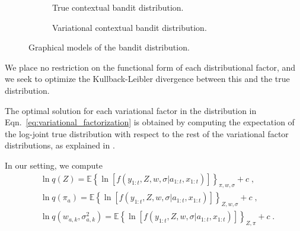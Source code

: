 \documentclass{article}
\newcommand{\eValue}[1]{\mathbb{E}\left\{ #1 \right\}}
\begin{document}
\begin{figure*}[!h]
	\centering
	\begin{subfigure}[b]{0.49\textwidth}
		\begin{center}
			
		\end{center}
		\label{fig:true_bandit}
		\caption{True contextual bandit distribution.}
	\end{subfigure}
	\begin{subfigure}[b]{0.49\textwidth}	
		\begin{center}
			
		\end{center}
		\label{fig:variational_bandit}
		\caption{Variational contextual bandit distribution.}
	\end{subfigure}
	\caption{Graphical models of the bandit distribution.}
	\label{fig:graphical_bandit}
\end{figure*}

We place no restriction on the functional form of each distributional factor, and we seek to optimize the Kullback-Leibler divergence between this and the true distribution.

The optimal solution for each variational factor in the distribution in Eqn.~\eqref{eq:variational_factorization} is obtained by computing the expectation of the log-joint true distribution with respect to the rest of the variational factor distributions, as explained in \cite{b-Bishop2006}.

In our setting, we compute
\begin{equation}
\begin{split}
&\ln q(Z) =\eValue{\ln\left[f(y_{1:t}, Z, w, \sigma|a_{1:t}, x_{1:t})\right]}_{\pi, w, \sigma}+c \;, \\
&\ln q(\pi_a) =\eValue{\ln\left[f(y_{1:t}, Z, w, \sigma|a_{1:t}, x_{1:t})\right]}_{Z, w, \sigma}+c \;,\\
&\ln q(w_{a,k},\sigma_{a,k}^2) =\eValue{\ln\left[f(y_{1:t}, Z, w, \sigma|a_{1:t}, x_{1:t})\right]}_{Z,\pi}+c \;.\\
\end{split}
\end{equation}
\end{document}
